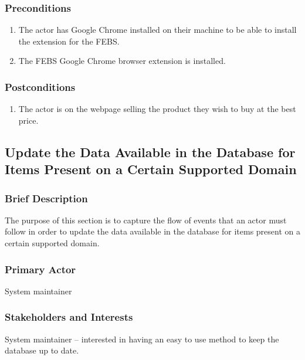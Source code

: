 \documentclass[12pt,a4paper,twoside]{report}
\begin{document}
\subsubsection{Preconditions}

\begin{enumerate}
  \item The actor has Google Chrome installed on their machine to be able to install the extension for the FEBS.
  \item The FEBS Google Chrome browser extension is installed.
\end{enumerate}


\subsubsection{Postconditions}

\begin{enumerate}
  \item The actor is on the webpage selling the product they wish to buy at the best price.
\end{enumerate}


\subsection{Update the Data Available in the Database for Items Present on a Certain Supported Domain} \label{sec:use_case_crawl_update_database}

\subsubsection{Brief Description}

The purpose of this section is to capture the flow of events that an actor must follow in order to update the data available in the database for items present on a certain supported domain.


\subsubsection{Primary Actor}

System maintainer


\subsubsection{Stakeholders and Interests}

System maintainer – interested in having an easy to use method to keep the database up to date.
\end{document}
